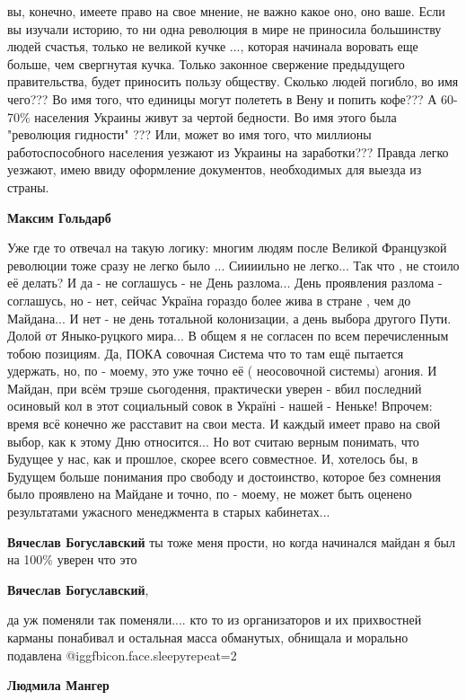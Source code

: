 \begin{itemize}
\begin{itemize}
вы, конечно, имеете право на свое мнение, не важно какое оно, оно ваше. Если вы
изучали историю, то ни одна революция в мире не приносила большинству людей
счастья, только не великой кучке ..., которая начинала воровать еще больше, чем
свергнутая кучка. Только законное свержение предыдущего правительства, будет
приносить пользу обществу. Сколько людей погибло, во имя чего??? Во имя того,
что единицы могут полететь в Вену и попить кофе??? А 60-70\% населения Украины
живут за чертой бедности. Во имя этого была "революция гидности" ??? Или, может
во имя того, что миллионы работоспособного населения уезжают из Украины на
заработки??? Правда легко уезжают, имею ввиду оформление документов,
необходимых для выезда из страны.

\textbf{Максим Гольдарб} 

Уже где то отвечал на такую логику: многим людям после Великой Французкой
революции тоже сразу не легко было ... Сиииильно не легко... Так что , не
стоило её делать? И да - не соглашусь - не День разлома... День проявления
разлома - соглашусь, но - нет, сейчас Україна гораздо более жива в стране , чем
до Майдана... И нет - не день тотальной колонизации, а день выбора другого
Пути. Долой от Яныко-руцкого мира... В общем я не согласен по всем
перечисленным тобою позициям. Да, ПОКА совочная Система что то там ещё пытается
удержать, но, по - моему, это уже точно её ( неосовочной системы) агония. И
Майдан, при всём трэше сьогодення, практически уверен - вбил последний
осиновый кол в этот социальный совок в Україні - нашей - Неньке! Впрочем: время
всё конечно же расставит на свои места. И каждый имеет право на свой выбор, как
к этому Дню относится... Но вот считаю верным понимать, что Будущее у нас, как
и прошлое, скорее всего совместное. И, хотелось бы, в Будущем больше
понимания про свободу и достоинство, которое без сомнения было проявлено на
Майдане и точно, по - моему, не может быть оценено результатами ужасного
менеджмента в старых кабинетах...

\textbf{Вячеслав Богуславский} ты тоже меня прости, но когда начинался майдан я был на 100\% уверен что это

\textbf{Вячеслав Богуславский},

да уж поменяли так поменяли.... кто то из организаторов и их прихвостней карманы
понабивал и остальная масса обманутых, обнищала и морально подавлена @igg{fbicon.face.sleepy}{repeat=2} 

\textbf{Людмила Мангер} 


\end{itemize}
\end{itemize}
